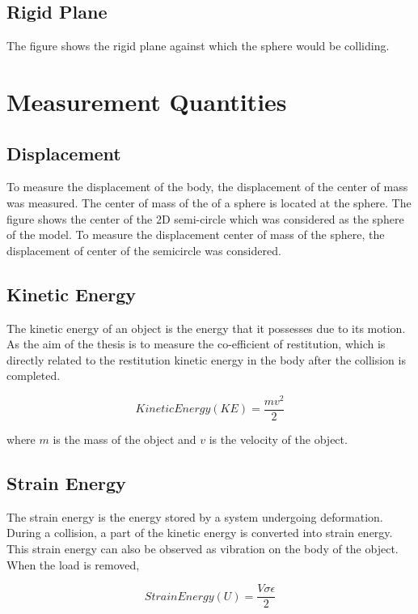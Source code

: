 \subsection{Rigid Plane}

The figure shows the rigid plane against which the sphere would be colliding. 

\section{Measurement Quantities}

\subsection{Displacement}

To measure the displacement of the body, the displacement of the center of mass was measured. The center of mass of the of a sphere is located at the sphere. The figure shows the center of the 2D semi-circle which was considered as the sphere of the model. To measure the displacement center of mass of the sphere, the displacement of center of the semicircle was considered.

\subsection{Kinetic Energy}

The kinetic energy of an object is the energy that it possesses due to its motion. As the aim of the thesis is to measure the co-efficient of restitution, which is directly related to the restitution kinetic energy in the body after the collision is completed.

\begin{equation}
Kinetic Energy(KE) = \frac{mv^{2}}{2}
\end{equation}
 
 where $m$ is the mass of the object and $v$ is the velocity of the object.

\subsection{Strain Energy}

The strain energy is the energy stored by a system undergoing deformation. During a collision, a part of the kinetic energy is converted into strain energy. This strain energy can also be observed as vibration on the body of the object. When the load is removed,

\begin{equation}
Strain Energy(U) = \frac{V\sigma\epsilon}{2}
\end{equation}

